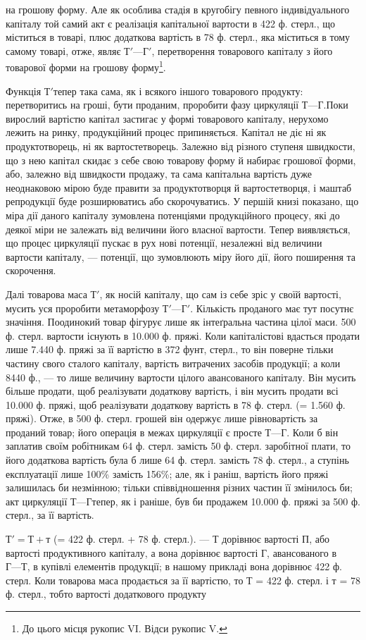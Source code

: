 \parcont{}  %
на грошову форму. Але як особлива стадія в кругобігу певного індивідуального
капіталу той самий акт є реалізація капітальної вартости
в 422 ф. стерл., що міститься в товарі, плюс додаткова вартість в 78 ф.
стерл., яка міститься в тому самому товарі, отже, являє $Т' — Г'$, перетворення
товарового капіталу з його товарової форми на грошову форму\footnote{
До цього місця рукопис VI. Відси рукопис V.
}.

Функція $Т' т$епер така сама, як і всякого іншого товарового продукту:
перетворитись на гроші, бути проданим, проробити фазу циркуляції
$Т — Г. П$оки вирослий вартістю капітал застигає у формі товарового
капіталу, нерухомо лежить на ринку, продукційний процес припиняється.
Капітал не діє ні як продуктотворець, ні як вартостетворець. Залежно від
різного ступеня швидкости, що з нею капітал скидає з себе свою товарову
форму й набирає грошової форми, або, залежно від швидкости продажу,
та сама капітальна вартість дуже неоднаковою мірою буде правити за
продуктотворця й вартостетворця, і маштаб репродукції буде розширюватись
або скорочуватись. У першій книзі показано, що міра дії даного
капіталу зумовлена потенціями продукційного процесу, які до деякої
міри не залежать від величини його власної вартости. Тепер виявляється,
що процес циркуляції пускає в рух нові потенції, незалежні від величини
вартости капіталу, — потенції, що зумовлюють міру його дії, його поширення
та скорочення.

Далі товарова маса $Т'$, як носій капіталу, що сам із себе зріс у своїй
вартості, мусить уся проробити метаморфозу $Т' — Г'$. Кількість проданого
має тут посутнє значіння. Поодинокий товар фігурує лише як інтеґральна
частина цілої маси. 500 ф. стерл. вартости існують в 10.000 ф. пряжі.
Коли капіталістові вдасться продати лише 7.440 ф. пряжі за її вартістю
в 372 фунт, стерл., то він поверне тільки частину свого сталого капіталу,
вартість витрачених засобів продукції; а коли 8440 ф., — то лише величину
вартости цілого авансованого капіталу. Він мусить більше продати, щоб
реалізувати додаткову вартість, і він мусить продати всі 10.000 ф.
пряжі, щоб реалізувати додаткову вартість в 78 ф. стерл. (= 1.560 ф.
пряжі). Отже, в 500 ф. стерл. грошей він одержує лише рівновартість
за проданий товар; його операція в межах циркуляції є просте $Т — Г$.
Коли б він заплатив своїм робітникам 64 ф. стерл. замість 50 ф. стерл.
заробітної плати, то його додаткова вартість була б лише 64 ф. стерл.
замість 78 ф. стерл., а ступінь експлуатації лише 100\% замість
156\%; але, як і раніш, вартість його пряжі залишилась би незмінною;
тільки співвідношення різних частин її змінилось би; акт циркуляції $Т — Г
т$епер, як і раніше, був би продажем 10.000 ф. пряжі за 500 ф. стерл.,
за її вартість.

$Т' = Т + т$ (= 422 ф. стерл. + 78 ф. стерл.). — Т дорівнює вартості П,
або вартості продуктивного капіталу, а вона дорівнює вартості Г, авансованого
в $Г — Т$, в купівлі елементів продукції; в нашому прикладі вона
дорівнює 422 ф. стерл. Коли товарова маса продається за її вартістю, то
Т = 422 ф. стерл. і т = 78 ф. стерл., тобто вартості додаткового продукту
\parbreak{}  %
